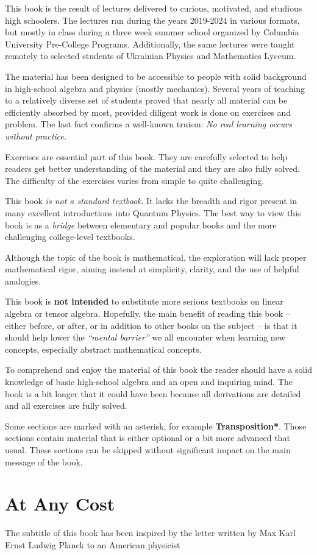 This book is the result of lectures delivered to curious, motivated, and studious high schoolers. The lectures ran  during the years 2019-2024 in various formats, but mostly in class during a three week summer school organized by Columbia University Pre-College Programs. Additionally, the same lectures were taught remotely to selected students of Ukrainian Physics and Mathematics Lyceum. 

The material has been designed to be accessible to people with solid background in high-school algebra and physics (mostly mechanics). Several years of teaching to a relatively diverse set of students proved that nearly all material can be efficiently absorbed by most, provided diligent work is done on exercises and problem. The last fact confirms a well-known truism: \emph{No real learning occurs without practice.}

Exercises are essential part of this book.  They are carefully selected to help readers get better understanding of the material and they are also fully solved. The difficulty of the exercises varies from simple to quite challenging.

This book \emph{is not a standard textbook}. It lacks the breadth and rigor present in many excellent introductions into Quantum Physics. The best way to view this book is as a \emph{bridge} between  elementary and popular books and the more challenging college-level textbooks. 

Although the topic of the book is mathematical, the exploration will
lack proper mathematical rigor, aiming instead at simplicity, clarity,
and the use of helpful analogies.

This book is {\bf not intended} to substitute more serious textbooks on linear
algebra or tensor algebra. Hopefully, the main benefit of
reading this book -- either before, or after, or in addition to other
books on the subject -- is that it should help lower the
\emph{``mental barrier''} we all encounter when
learning new concepts, especially abstract mathematical concepts.

To comprehend and enjoy the material of this book the reader should
have a solid knowledge of basic high-school algebra and an open and
inquiring mind. The book is a bit longer that it could have been
because all derivations are detailed and all exercises are fully
solved.

Some sections are marked with an asterisk, for example
{\bf Transposition*}. Those sections contain material that is either
optional or a bit more advanced that usual. These sections can be
skipped without significant impact on the main message of the book.


\section*{At Any Cost}
The subtitle of this book has been inspired by the letter written by Max Karl Ernst Ludwig Planck to an American physicist

